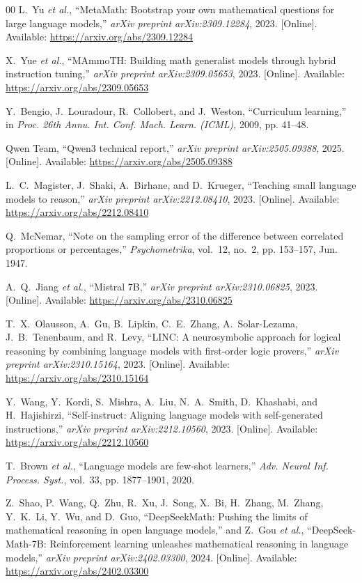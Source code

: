 \documentclass{ieeeaccess}
\begin{document}
\begin{thebibliography}{00}
L.~Yu \emph{et al.},
``{MetaMath}: Bootstrap your own mathematical questions for large
language models,''
\emph{arXiv preprint arXiv:2309.12284}, 2023. [Online]. Available:
\underline{https://arxiv.org/abs/2309.12284}

X.~Yue \emph{et al.},
``{MAmmoTH}: Building math generalist models through hybrid instruction
tuning,''
\emph{arXiv preprint arXiv:2309.05653}, 2023. [Online]. Available:
\underline{https://arxiv.org/abs/2309.05653}

Y.~Bengio, J.~Louradour, R.~Collobert, and J.~Weston,
``Curriculum learning,''
in \emph{Proc. 26th Annu. Int. Conf. Mach. Learn. (ICML)}, 2009,
pp. 41--48.

{Qwen Team},
``{Qwen3} technical report,''
\emph{arXiv preprint arXiv:2505.09388}, 2025. [Online]. Available:
\underline{https://arxiv.org/abs/2505.09388}

L.~C.~Magister, J.~Shaki, A.~Birhane, and D.~Krueger,
``Teaching small language models to reason,''
\emph{arXiv preprint arXiv:2212.08410}, 2023. [Online]. Available:
\underline{https://arxiv.org/abs/2212.08410}

Q.~McNemar,
``Note on the sampling error of the difference between correlated
proportions or percentages,''
\emph{Psychometrika}, vol.~12, no.~2, pp. 153--157, Jun. 1947.

A.~Q.~Jiang \emph{et al.},
``Mistral 7B,''
\emph{arXiv preprint arXiv:2310.06825}, 2023. [Online]. Available:
\underline{https://arxiv.org/abs/2310.06825}

T.~X.~Olausson, A.~Gu, B.~Lipkin, C.~E.~Zhang, A.~Solar-Lezama,
J.~B.~Tenenbaum, and R.~Levy,
``{LINC}: A neurosymbolic approach for logical reasoning by combining
language models with first-order logic provers,''
\emph{arXiv preprint arXiv:2310.15164}, 2023. [Online]. Available:
\underline{https://arxiv.org/abs/2310.15164}

Y.~Wang, Y.~Kordi, S.~Mishra, A.~Liu, N.~A.~Smith, D.~Khashabi,
and H.~Hajishirzi,
``Self-instruct: Aligning language models with self-generated instructions,''
\emph{arXiv preprint arXiv:2212.10560}, 2023. [Online]. Available:
\underline{https://arxiv.org/abs/2212.10560}

T.~Brown \emph{et al.},
``Language models are few-shot learners,''
\emph{Adv. Neural Inf. Process. Syst.}, vol.~33, pp. 1877--1901, 2020.

Z.~Shao, P.~Wang, Q.~Zhu, R.~Xu, J.~Song, X.~Bi, H.~Zhang, M.~Zhang,
Y.~K.~Li, Y.~Wu, and D.~Guo,
``{DeepSeekMath}: Pushing the limits of mathematical reasoning in open
language models,'' and
Z.~Gou \emph{et al.},
``{DeepSeek-Math-7B}: Reinforcement learning unleashes mathematical
reasoning in language models,''
\emph{arXiv preprint arXiv:2402.03300}, 2024. [Online]. Available:
\underline{https://arxiv.org/abs/2402.03300}


\end{thebibliography}
\end{document}
